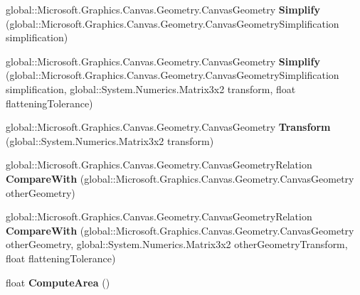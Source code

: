 \begin{DoxyCompactItemize}
global\+::\+Microsoft.\+Graphics.\+Canvas.\+Geometry.\+Canvas\+Geometry {\bfseries Simplify} (global\+::\+Microsoft.\+Graphics.\+Canvas.\+Geometry.\+Canvas\+Geometry\+Simplification simplification)
\item 
\mbox{\label{class_microsoft_1_1_graphics_1_1_canvas_1_1_geometry_1_1_canvas_geometry_a75548d17512c7e4839b879a019ea52f2}} 
global\+::\+Microsoft.\+Graphics.\+Canvas.\+Geometry.\+Canvas\+Geometry {\bfseries Simplify} (global\+::\+Microsoft.\+Graphics.\+Canvas.\+Geometry.\+Canvas\+Geometry\+Simplification simplification, global\+::\+System.\+Numerics.\+Matrix3x2 transform, float flattening\+Tolerance)
\item 
\mbox{\label{class_microsoft_1_1_graphics_1_1_canvas_1_1_geometry_1_1_canvas_geometry_a294f720439af95f7c721bc3c6c501e66}} 
global\+::\+Microsoft.\+Graphics.\+Canvas.\+Geometry.\+Canvas\+Geometry {\bfseries Transform} (global\+::\+System.\+Numerics.\+Matrix3x2 transform)
\item 
\mbox{\label{class_microsoft_1_1_graphics_1_1_canvas_1_1_geometry_1_1_canvas_geometry_a4af4b0665650464ff178a62d44d41cd9}} 
global\+::\+Microsoft.\+Graphics.\+Canvas.\+Geometry.\+Canvas\+Geometry\+Relation {\bfseries Compare\+With} (global\+::\+Microsoft.\+Graphics.\+Canvas.\+Geometry.\+Canvas\+Geometry other\+Geometry)
\item 
\mbox{\label{class_microsoft_1_1_graphics_1_1_canvas_1_1_geometry_1_1_canvas_geometry_a46984a998579f41371f806face56cd8a}} 
global\+::\+Microsoft.\+Graphics.\+Canvas.\+Geometry.\+Canvas\+Geometry\+Relation {\bfseries Compare\+With} (global\+::\+Microsoft.\+Graphics.\+Canvas.\+Geometry.\+Canvas\+Geometry other\+Geometry, global\+::\+System.\+Numerics.\+Matrix3x2 other\+Geometry\+Transform, float flattening\+Tolerance)
\item 
\mbox{\label{class_microsoft_1_1_graphics_1_1_canvas_1_1_geometry_1_1_canvas_geometry_aa08eda160516a30cec6d6df2eff63201}} 
float {\bfseries Compute\+Area} ()

\end{DoxyCompactItemize}
